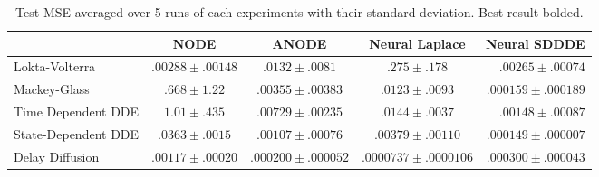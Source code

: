 \begin{table}[t]
\begin{center}
\begin{small}
\begin{sc}
\begin{tabular}{l|cccr}
   & NODE &  ANODE & Neural Laplace & Neural SDDDE \\
\hline
Lokta-Volterra & $.00288 \pm .00148$ & $.0132 \pm .0081$ & $.275 \pm .178$ & $ \mathbf{.00265 \pm .00074}$ \\
Mackey-Glass & $.668 \pm 1.22$ &  $ .00355 \pm .00383$& $.0123 \pm .0093$ & $\mathbf{.000159 \pm .000189}$ \\
Time Dependent DDE &  $1.01 \pm .435$ & $.00729 \pm .00235$ & $.0144 \pm .0037$ & $\mathbf{.00148 \pm  .00087}$ \\
State-Dependent DDE & $.0363 \pm .0015$ & $.00107 \pm .00076$ & $.00379 \pm .00110$ & $\mathbf{.000149 \pm .000007}$ \\
Delay Diffusion & $.00117 \pm .00020$ & $.000200 \pm .000052$ & $\mathbf{.0000737 \pm .0000106}$ & $.000300 \pm .000043$ \\
\hline
\end{tabular}
\end{sc}
\end{small}
\caption{Test MSE averaged over 5 runs of each experiments with their standard deviation. Best result bolded.}
\label{test_rmse}
\end{center}
\end{table}
